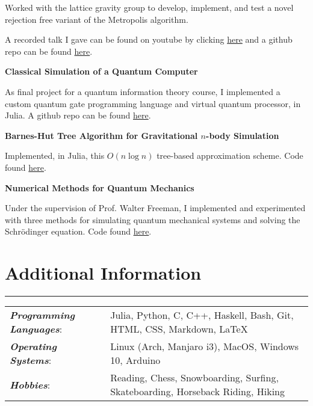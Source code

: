 \documentclass{article}
\newcommand{\myline}{\rule[\baselineskip]{\linewidth}{1pt}}
\begin{document}
\begin{compactitem}
\item Worked with the lattice gravity group to develop, implement, and test a novel rejection free variant of the Metropolis algorithm. 
\item A recorded talk I gave can be found on youtube by clicking \href{https://www.youtube.com/watch?v=_Ppx0e3aG-E&t=2s}{here} and a github repo can be found \href{https://github.com/aarontrowbridge/Ising}{here}.
\end{compactitem}

\vspace{2.5pt}
\large\textbf{Classical Simulation of a Quantum Computer}
\normalsize

\begin{compactitem}
\item As final project for a quantum information theory course, I implemented a custom quantum gate programming language and virtual quantum processor, in Julia. A github repo can be found \href{https://github.com/aarontrowbridge/QuIPS}{here}.
\end{compactitem}


\vspace{2.5pt}
\large\textbf{Barnes-Hut Tree Algorithm for Gravitational $n$-body Simulation}
\normalsize

\begin{compactitem}
\item Implemented, in Julia, this $O(n \log n)$ tree-based approximation scheme. Code found \href{https://github.com/aarontrowbridge/Gravity}{here}. 
\end{compactitem}


\vspace{2.5pt}
\large\textbf{Numerical Methods for Quantum Mechanics}
\normalsize

\begin{compactitem}
\item Under the supervision of Prof. Walter Freeman, I implemented and experimented with three methods for simulating quantum mechanical systems and solving the Schr\"odinger equation. Code found \href{https://github.com/aarontrowbridge/Quantum}{here}. 
\end{compactitem}



\section{Additional Information}
\myline

\normalsize

\begin{tabular}{ll}
\textbf{\textit{Programming Languages}}: & Julia, Python, C, C++,  Haskell, Bash, Git, HTML, CSS, Markdown, \LaTeX \\
\textbf{\textit{Operating Systems}}: & Linux (Arch, Manjaro i3), MacOS, Windows 10, Arduino \\ 
\textbf{\textit{Hobbies}}: & Reading, Chess, Snowboarding, Surfing, Skateboarding, Horseback Riding, Hiking \\    
\end{tabular}
\end{document}
